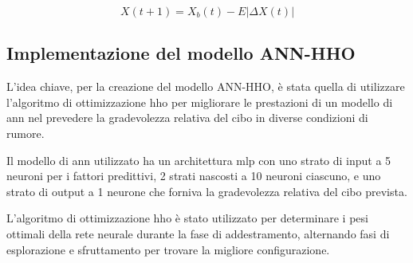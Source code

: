 \begin{equation}
      X(t+1) = X_{b}(t) - E|\Delta X(t)|
\end{equation}

\subsection{Implementazione del modello ANN-HHO}
\noindent

L'idea chiave, per la creazione del modello ANN-HHO, è stata quella di utilizzare l'algoritmo di ottimizzazione \gls{hho} per migliorare le prestazioni di un modello di \gls{ann} nel prevedere la gradevolezza relativa del cibo in  diverse condizioni di rumore.

Il modello di \gls{ann} utilizzato ha un architettura \gls{mlp} con uno strato di input a 5 neuroni per i fattori predittivi, 2 strati nascosti a 10 neuroni ciascuno, e uno strato di output a 1 neurone che forniva la gradevolezza relativa del cibo prevista. 

L'algoritmo di ottimizzazione \gls{hho} è stato utilizzato per determinare i pesi ottimali della rete neurale durante la fase di addestramento, alternando fasi di esplorazione e sfruttamento per trovare la migliore configurazione.

